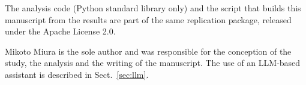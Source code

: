 \documentclass[pdflatex,sn-basic]{sn-jnl}
\begin{document}
The analysis code (Python standard library only) and the script that builds this manuscript from the results are part of the same replication package, released under the Apache License 2.0.

Mikoto Miura is the sole author and was responsible for the conception of the study, the analysis and the writing of the manuscript. The use of an LLM-based assistant is described in Sect.~\ref{sec:llm}.


\end{document}
